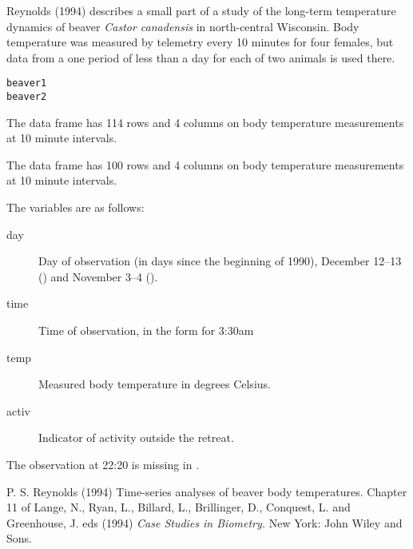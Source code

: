 %
\begin{Description}\relax
Reynolds (1994) describes a small part of a study of the long-term
temperature dynamics of beaver \emph{Castor canadensis} in
north-central Wisconsin.  Body temperature was measured by telemetry
every 10 minutes for four females, but data from a one period of
less than a day for each of two animals is used there. 
\end{Description}
%
\begin{Usage}
\begin{verbatim}
beaver1
beaver2
\end{verbatim}
\end{Usage}
%
\begin{Format}
The  data frame has 114 rows and 4 columns on body
temperature measurements at 10 minute intervals.

The  data frame has 100 rows and 4 columns on body
temperature measurements at 10 minute intervals.

The variables are as follows:
\begin{description}

\item[day] Day of observation (in days since the beginning of
1990), December 12--13 () and November 3--4
().
\item[time] Time of observation, in the form  for
3:30am
\item[temp] Measured body temperature in degrees Celsius.
\item[activ] Indicator of activity outside the retreat.

\end{description}

\end{Format}
%
\begin{Note}\relax
The observation at 22:20 is missing in .
\end{Note}
%
\begin{Source}\relax
P. S. Reynolds (1994) Time-series analyses of beaver body
temperatures.  Chapter 11 of Lange, N., Ryan, L., Billard, L.,
Brillinger, D., Conquest, L. and Greenhouse, J. eds (1994)
\emph{Case Studies in Biometry.}
New York: John Wiley and Sons.
\end{Source}
%
